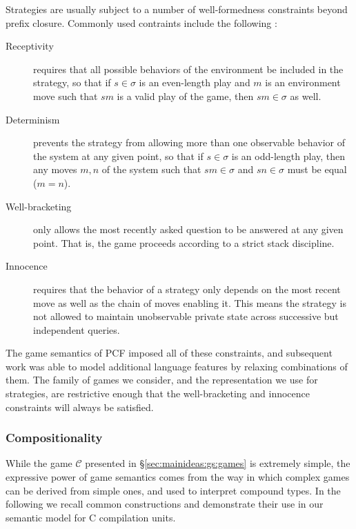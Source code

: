 \documentclass[sigplan,10pt,review,anonymous]{acmart}
\begin{document}
Strategies are usually subject to a number
of well-formedness constraints beyond prefix closure.
Commonly used contraints include the following \cite{gamesem99}:
\begin{description}
\item[Receptivity]
  requires that all possible behaviors of the environment
  be included in the strategy,
  so that if $s \in \sigma$ is an even-length play and
  $m$ is an environment move such that $sm$ is a valid play of the game,
  then $sm \in \sigma$ as well.
\item[Determinism]
  prevents the strategy from allowing
  more than one observable behavior of the system at any given point,
  so that if $s \in \sigma$ is an odd-length play,
  then any moves $m, n$ of the system
  such that $sm \in \sigma$ and $sn \in \sigma$
  must be equal ($m = n$).
\item[Well-bracketing]
  only allows the most recently asked question
  to be answered at any given point.
  That is,
  the game proceeds according to a strict stack discipline.
\item[Innocence]
  requires that the behavior of a strategy
  only depends on the most recent move
  as well as the chain of moves enabling it.
  This means the strategy is not allowed to maintain
  unobservable private state across
  successive but independent queries.
\end{description}
The game semantics of PCF
imposed all of these constraints,
and subsequent work was able to model additional language features
by relaxing combinations of them.
The family of games we consider,
and the representation we use for strategies,
are restrictive enough that
the well-bracketing and innocence constraints
will always be satisfied.


\subsubsection{Compositionality} \label{sec:mainideas:gs:comp} %

While the game $\mathcal{C}$
presented in \S\ref{sec:mainideas:gs:games}
is extremely simple,
the expressive power of game semantics
comes from the way in which complex games can be derived from simple ones,
and used to interpret compound types.
In the following we recall common constructions
and demonstrate their use
in our semantic model for C compilation units.
\end{document}
